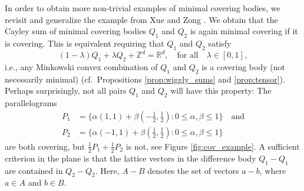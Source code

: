 \documentclass[11pt, a4paper]{amsart}
\newcommand{\RR}{\mathbb{R}}
\newcommand{\ZZ}{\mathbb{Z}}
\numberwithin{equation}{section}
\theoremstyle{plain}
\begin{document}
In order to obtain more non-trivial examples of minimal covering bodies, we revisit and generalize the example from Xue and Zong \cite{xuezong}. We obtain that the Cayley sum of minimal covering bodies $Q_1$ and $Q_2$ is again minimal covering if
it is covering.
This is equivalent requiring that $Q_1$ and $Q_2$ satisfy
\begin{equation}
\label{eq:bm_property}
(1-\lambda)Q_1 + \lambda Q_2 + \ZZ^d = \RR^d,\quad\text{for all}\quad\lambda\in [0,1],
\end{equation} 
i.e., any Minkowski convex combination of $Q_1$ and $Q_2$ is a covering body (not necessarily minimal) (cf.\ Propositions \ref{prop:wiggly_sums} and \ref{prop:tensor}).  Perhaps surprisingly, not all pairs $Q_1$ and $Q_2$ will have this property: The parallelograms
\begin{equation}
\label{eq:parallelograms}
\begin{split}
P_1 &= \{ \alpha (1,1) + \beta (-\tfrac 12, \tfrac 12) : 0\leq \alpha,\beta\leq 1\}\quad \text{and}\\
P_2 &= \{ \alpha (-1,1) + \beta (\tfrac 12, \tfrac 12) : 0\leq \alpha,\beta\leq 1\}
\end{split}
\end{equation}
are both covering, but $\tfrac 12 P_1 + \tfrac 12 P_2$ is not, see Figure \ref{fig:cov_example}. A sufficient criterion in the plane is that the lattice vectors in the difference body $Q_1-Q_1$ are contained in $Q_2-Q_2$. Here, $A-B$ denotes the set of vectors $a-b$, where $a\in A$ and $b\in B$. 
\end{document}
